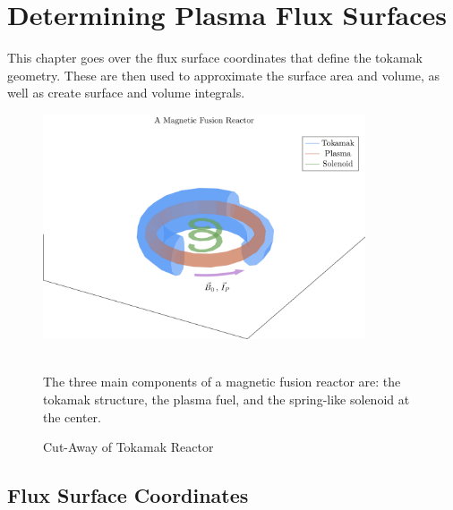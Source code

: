 \chapter{Determining Plasma Flux Surfaces}

\label{chapter:flux}

This chapter goes over the flux surface coordinates that define the tokamak geometry. These are then used to approximate the surface area and volume, as well as create surface and volume integrals.

\begin{figure}[h]
	\centering
	\includegraphics[width=0.85\textwidth]{images/fusion_reactor}
	\caption{Cut-Away of Tokamak Reactor} ~\\
	\small The three main components of a magnetic fusion reactor are: the tokamak structure, the plasma fuel, and the spring-like solenoid at the center.
\end{figure}

\section{Flux Surface Coordinates}

